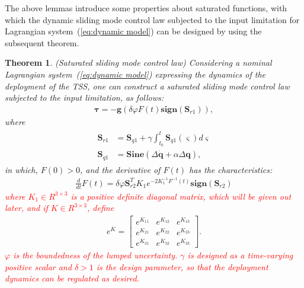 \documentclass[3p]{elsarticle}
\theoremstyle{plain}
\newtheorem{mythm}{Theorem}
\theoremstyle{remark}
\begin{document}
The above lemmas introduce some properties about saturated functions, with which the dynamic sliding mode control law subjected to the input limitation for Lagrangian system~(\ref{eq:dynamic model}) can be designed by using the subsequent theorem.
\begin{mythm}\label{thm:1}(Saturated sliding mode control law)
Considering a nominal Lagrangian system~(\ref{eq:dynamic model}) expressing the dynamics of the deployment of the TSS, one can construct a saturated sliding mode control law subjected to the input limitation, as follows:
\begin{align}
\bm\tau = -\bm{g}(\delta\varphi F(t) \bm{sign}(\bm S_{r1})),\label{eq:slider control}
\end{align}
where
\begin{align}
\begin{split}
\bm S_{r1} &= \bm S_{q1}+\gamma\int^t_{t_0}\bm S_{q1}(\varsigma) d\varsigma\\
\bm S_{q1} &= \bm{Sine}(\Delta \dot {\bm q}+\alpha\Delta\bm q),
\end{split}
\end{align}
in which, $F(0)>0$, and the derivative of $F(t)$ has the characteristics:
\begin{align}
\frac{d}{dt}F(t) = \delta\varphi \bm S_{r2}^T K_1e^{-2K_1^{-1}F^{-1}(t)}\bm{sign}(\bm S_{r2})
\end{align}
\textcolor{red}{where $K_1\in R^{3\times 3}$ is a positive definite diagonal matrix, which will be given out later, and if $K\in R^{3\times 3}$, define}
\begin{align}
e^K=
\begin{bmatrix}
e^{K_{11}}&e^{K_{12}}&e^{K_{13}}\\
e^{K_{21}}&e^{K_{22}}&e^{K_{23}}\\
e^{K_{31}}&e^{K_{32}}&e^{K_{33}}
\end{bmatrix}.
\end{align}
\textcolor{red}{$\varphi$ is the boundedness of the lumped uncertainty. $\gamma$ is designed as a time-varying positive scalar and $\delta>1$ is the design parameter, so that the deployment dynamics can be regulated as desired.}
\end{mythm}
\end{document}
